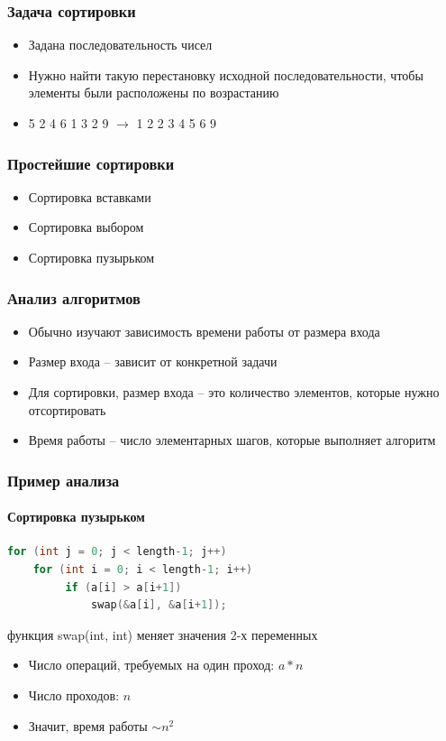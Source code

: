 \documentclass[12pt,pdf,hyperref={unicode}]{beamer}
\begin{document}
\begin{frame}[fragile]
\frametitle{Задача сортировки} 
\begin{itemize}
\item Задана последовательность чисел \\
\item Нужно найти такую перестановку исходной последовательности, чтобы элементы были расположены по возрастанию  \\
\item 5 2 4 6 1 3 2 9  $\rightarrow$ 1 2 2 3 4 5 6 9
\end{itemize}
\end{frame}


\begin{frame}[fragile]
\frametitle{Простейшие сортировки} 
\begin{itemize}
\item Сортировка вставками \\
\item Сортировка выбором \\
\item Сортировка пузырьком \\
\end{itemize}
\end{frame}


\begin{frame}[fragile]
\frametitle{Анализ алгоритмов} 
\begin{itemize}
\item Обычно изучают зависимость времени работы от размера входа \\
\item Размер входа -- зависит от конкретной задачи \\
\item Для сортировки, размер входа -- это количество элементов, которые нужно отсортировать \\
\item Время работы -- число элементарных шагов, которые выполняет алгоритм
\end{itemize}
\end{frame}

\begin{frame}[fragile]
\frametitle{Пример анализа} 
\framesubtitle{Сортировка пузырьком}
\begin{lstlisting}[language=C++,basicstyle=\ttfamily,keywordstyle=\color{blue}]
for (int j = 0; j < length-1; j++)
    for (int i = 0; i < length-1; i++)
         if (a[i] > a[i+1])
             swap(&a[i], &a[i+1]);
\end{lstlisting}
функция swap(int, int) меняет значения 2-х переменных 
\begin{itemize}
\item Число операций, требуемых на один проход: $a * n$\\
\item Число проходов: $n$\\
\item Значит, время работы $\sim n^2$\\
\end{itemize}

\end{frame}
\end{document}
